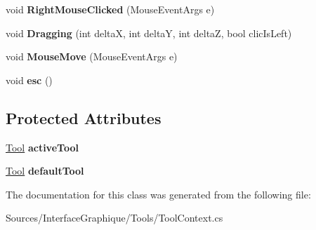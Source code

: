 \begin{DoxyCompactItemize}
\item 
\hypertarget{class_interface_graphique_1_1_tools_1_1_tool_context_ae5764c4f67efc35dd11594e2ed3649b9}{}void {\bfseries Right\+Mouse\+Clicked} (Mouse\+Event\+Args e)\label{class_interface_graphique_1_1_tools_1_1_tool_context_ae5764c4f67efc35dd11594e2ed3649b9}

\item 
\hypertarget{class_interface_graphique_1_1_tools_1_1_tool_context_a45ff94d5cb262b6746a37a8d3947a275}{}void {\bfseries Dragging} (int delta\+X, int delta\+Y, int delta\+Z, bool clic\+Is\+Left)\label{class_interface_graphique_1_1_tools_1_1_tool_context_a45ff94d5cb262b6746a37a8d3947a275}

\item 
\hypertarget{class_interface_graphique_1_1_tools_1_1_tool_context_a726f4e511b1c956d7e8a2ac7e4d4a269}{}void {\bfseries Mouse\+Move} (Mouse\+Event\+Args e)\label{class_interface_graphique_1_1_tools_1_1_tool_context_a726f4e511b1c956d7e8a2ac7e4d4a269}

\item 
\hypertarget{class_interface_graphique_1_1_tools_1_1_tool_context_a45152a956f4ddd1d76f39df4f10938c7}{}void {\bfseries esc} ()\label{class_interface_graphique_1_1_tools_1_1_tool_context_a45152a956f4ddd1d76f39df4f10938c7}

\end{DoxyCompactItemize}
\subsection*{Protected Attributes}
\begin{DoxyCompactItemize}
\item 
\hypertarget{class_interface_graphique_1_1_tools_1_1_tool_context_a981402115b53b8c35505f7a727eb878b}{}\hyperlink{class_interface_graphique_1_1_tools_1_1_tool}{Tool} {\bfseries active\+Tool}\label{class_interface_graphique_1_1_tools_1_1_tool_context_a981402115b53b8c35505f7a727eb878b}

\item 
\hypertarget{class_interface_graphique_1_1_tools_1_1_tool_context_a20bd28b2a8604546174317761372a6e9}{}\hyperlink{class_interface_graphique_1_1_tools_1_1_tool}{Tool} {\bfseries default\+Tool}\label{class_interface_graphique_1_1_tools_1_1_tool_context_a20bd28b2a8604546174317761372a6e9}

\end{DoxyCompactItemize}


The documentation for this class was generated from the following file\+:\begin{DoxyCompactItemize}
\item 
Sources/\+Interface\+Graphique/\+Tools/Tool\+Context.\+cs\end{DoxyCompactItemize}
